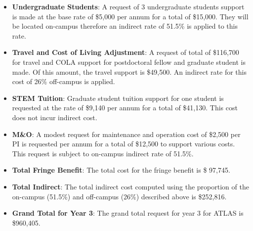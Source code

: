 \begin{enumerate}
\begin{itemize}
\item {{\bf Undergraduate Students}: A request of 3 undergraduate students support is made at the base rate of \$5,000 per annum for a total of \$15,000. They will be located on-campus therefore an indirect rate of 51.5\% is applied to this rate. }

\item{{\bf Travel and Cost of Living Adjustment}: A request of total of \$116,700 for travel and COLA support for postdoctoral fellow and graduate student is made. Of this amount, the travel support is \$49,500.  An indirect rate for this cost of 26\% off-campus is applied. }

\item {{\bf STEM Tuition}: Graduate student tuition support for one student is requested at the rate of \$9,140 per annum for a total of \$41,130.  This cost does not incur indirect cost.}

\item {{\bf M\&O}:  A modest request for maintenance and operation cost of \$2,500 per PI is requested per annum for a total of \$12,500 to support various costs. This request is subject to on-campus indirect rate of 51.5\%.}

\item {{\bf Total Fringe Benefit}:  The total cost for the fringe benefit is \$ 97,745.}

\item {{\bf Total Indirect}: The total indirect cost computed using the proportion of the on-campus (51.5\%) and off-campus (26\%) described above is \$252,816.}

\item {{\bf Grand Total for Year 3}: The grand total request for year 3 for ATLAS is \$960,405.}

\end{itemize}
\end{enumerate}

\newpage
